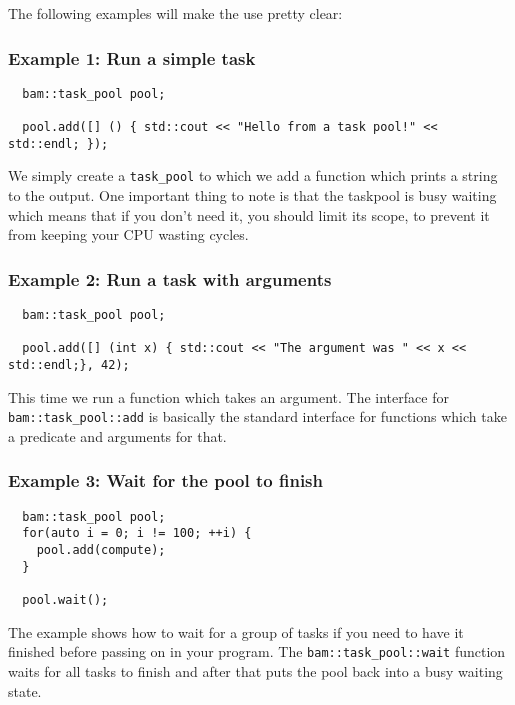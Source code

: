 \documentclass[11pt, a4paper]{article}
\begin{document}
The following examples will make the use pretty clear:

\subsubsection{Example 1: Run a simple task}

\begin{lstlisting}
  bam::task_pool pool;

  pool.add([] () { std::cout << "Hello from a task pool!" << std::endl; });

\end{lstlisting}

We simply create a \texttt{task\_pool} to which we add a function which prints a string to the output. One important thing to note is that the taskpool is busy waiting which means that if you don't need it, you should limit its scope, to prevent it from keeping your CPU wasting cycles.

\subsubsection{Example 2: Run a task with arguments}
\begin{lstlisting}
  bam::task_pool pool;

  pool.add([] (int x) { std::cout << "The argument was " << x << std::endl;}, 42);
\end{lstlisting}
This time we run a function which takes an argument. The interface for \texttt{bam::task\_pool::add} is basically the standard interface for functions which take a predicate and arguments for that. 

\subsubsection{Example 3: Wait for the pool to finish}
\begin{lstlisting}
  bam::task_pool pool;
  for(auto i = 0; i != 100; ++i) {
    pool.add(compute);
  }

  pool.wait();
\end{lstlisting}
The example shows how to wait for a group of tasks if you need to have it finished before passing on in your program. The \texttt{bam::task\_pool::wait} function waits for all tasks to finish and after that puts the pool back into a busy waiting state.
\end{document}
